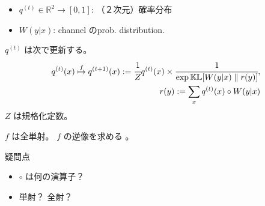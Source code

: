 \begin{itemize}

	\item $ q^{(t)} \in \mathbb{R}^2 \rightarrow [0,1]$: （２次元）確率分布 
	\item $W (y | x)$: channel のprob. distribution.
\end{itemize}

$q^{(t)}$ は次で更新する。
\begin{align}
	q^{(t)} (x) \overset{f}{\mapsto}
	q^{(t+1)} (x) := \cfrac{1}{Z} q^{(t)} (x) \times \cfrac{1}{\exp  \mathbb{KL} [W (y|x) \parallel r (y) ]}, 
	\\
	r (y) := \sum_x q^{(t)} (x) \circ W (y | x)
\end{align}
$Z$ は規格化定数。

$f$ は全単射。
$f$ の逆像を求める
。


疑問点
\begin{itemize}
	\item $\circ$ は何の演算子？
	\item 単射？ 全射？
\end{itemize}
